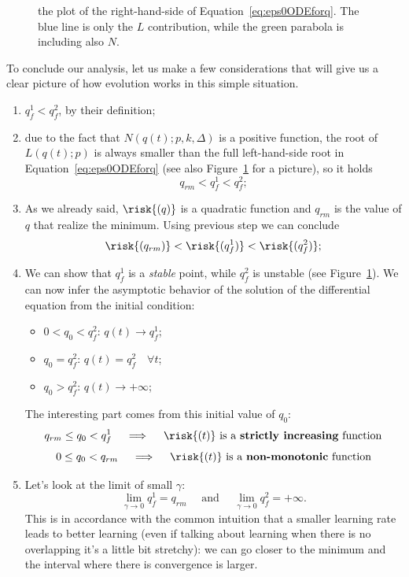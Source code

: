 \begin{figure}
    \centering
    \begin{tikzpicture}[x=1.cm,y=1.cm,domain=0.:10.,range=-3.:5.]
      
    \end{tikzpicture}
    \caption{
      the plot of the right-hand-side of Equation~\eqref{eq:eps0ODEforq}.
      The blue line is only the \(L\) contribution, while the green parabola is including also \(N\).
    }
    \label{fig:epsilon0stablepoints}
\end{figure}
To conclude our analysis, let us make a few considerations that will give us a clear picture
of how evolution works in this simple situation.
\begin{enumerate}
  \item \(q_f^1 < q_f^2\), by their definition;
  \item due to the fact that \(N{(q{(t)};p,k,\Delta)}\) is a positive function,
        the root of \(L{(q{(t)};p)}\) is always smaller than the full left-hand-side
        root in Equation~\eqref{eq:eps0ODEforq} (see also Figure~\ref{fig:epsilon0stablepoints} for a picture),
        so it holds\[q_{rm}<q_f^1 < q_f^2;\]
  \item As we already said, \(\risk{(q)}\) is a quadratic function and \(q_{rm}\) is the value of \(q\) that realize the minimum. Using previous step we can conclude
  \[\risk{(q_{rm})}<\risk{(q_f^1)} < \risk{(q_f^2)};\]
  \item We can show that \(q_f^1\) is a \emph{stable} point, while \(q_f^2\) is unstable (see Figure~\ref{fig:epsilon0stablepoints}).
  We can now infer the asymptotic behavior of the solution of the differential equation from the initial condition:
        \begin{itemize}
            \item \(0<q_0<q_f^2\): \(q{(t)}\to q_f^1\);
            \item \(q_0=q_f^2\): \(q{(t)}= q_f^2 \quad \forall t\);
            \item \(q_0>q_f^2\): \(q{(t)}\to +\infty\);
        \end{itemize}
        The interesting part comes from this initial value of \(q_0\):
        \[q_{rm}\le q_0<q_f^1 \quad \implies \quad \text{\(\risk{(t)}\) is a \textbf{strictly increasing} function}\]
        \[0\le q_0<q_{rm}     \quad \implies \quad \text{\(\risk{(t)}\) is a \textbf{non-monotonic} function}\]
  \item Let's look at the limit of small \(\gamma\):
        \[\lim_{\gamma\to0}q_f^1 = q_{rm} \quad\text{ and }\quad \lim_{\gamma\to0}q_f^2 = +\infty.\]
        This is in accordance with the common intuition that a smaller learning rate leads to better learning
        (even if talking about learning when there is no overlapping it's a little bit stretchy):
        we can go closer to the minimum and the interval where there is convergence is larger.
\end{enumerate}


